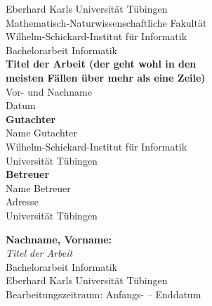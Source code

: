 \documentclass[twoside,12pt,a4paper]{scrreprt}
\begin{document}
\begin{titlepage}
\begin{center}
\LARGE Eberhard Karls Universität Tübingen\\
\large Mathematisch-Naturwissenschaftliche Fakultät \\
Wilhelm-Schickard-Institut für Informatik\\
[3cm]
\huge Bachelorarbeit Informatik\\
[2cm]
\Large\textbf{Titel der Arbeit (der geht wohl in den\\ meisten Fällen über mehr als eine Zeile)}\\
[1.5cm]
\large Vor- und Nachname\\
[0.5cm]
Datum\\
\vfill
\small\textbf{Gutachter}\\[0.3cm]
\large Name Gutachter\\
\footnotesize Wilhelm-Schickard-Institut für Informatik\\Universität Tübingen\\
[1cm]
\small\textbf{Betreuer}\\[0.3cm]
\large Name Betreuer\\
\footnotesize Adresse\\
Universität Tübingen
\end{center}
\end{titlepage}

\thispagestyle{empty}
\vspace*{\fill}
\textbf{Nachname, Vorname:}\\
\emph{Titel der Arbeit}\\
Bachelorarbeit Informatik\\
Eberhard Karls Universität Tübingen\\
Bearbeitungszeitraum: Anfangs- -- Enddatum
\newpage


\newpage

\tableofcontents\label{toc}
\cleardoublepage


\cleardoublepage


\cleardoublepage


\cleardoublepage
\end{document}
